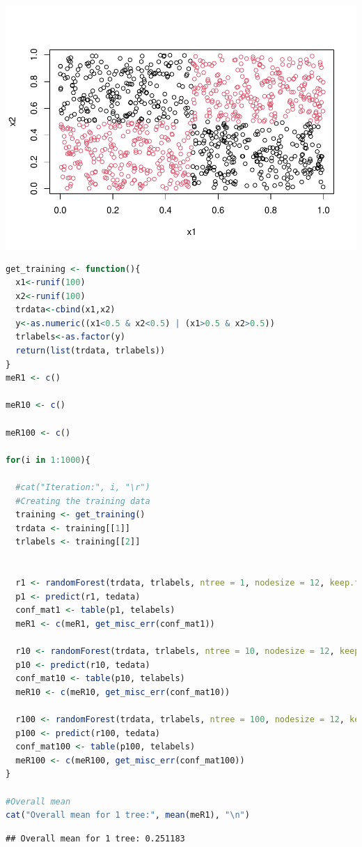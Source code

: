 \documentclass[
]{article}
\begin{document}
\includegraphics{Block2Lab1_files/figure-latex/1.4-1.pdf}

\begin{lstlisting}[language=R]
get_training <- function(){
  x1<-runif(100)
  x2<-runif(100)
  trdata<-cbind(x1,x2)
  y<-as.numeric((x1<0.5 & x2<0.5) | (x1>0.5 & x2>0.5))
  trlabels<-as.factor(y)
  return(list(trdata, trlabels))
}
meR1 <- c()

meR10 <- c()

meR100 <- c()

for(i in 1:1000){
  
  #cat("Iteration:", i, "\r")
  #Creating the training data
  training <- get_training()
  trdata <- training[[1]]
  trlabels <- training[[2]]
  
  
  r1 <- randomForest(trdata, trlabels, ntree = 1, nodesize = 12, keep.forest = TRUE)
  p1 <- predict(r1, tedata)
  conf_mat1 <- table(p1, telabels)
  meR1 <- c(meR1, get_misc_err(conf_mat1))
  
  r10 <- randomForest(trdata, trlabels, ntree = 10, nodesize = 12, keep.forest = TRUE)
  p10 <- predict(r10, tedata)
  conf_mat10 <- table(p10, telabels)
  meR10 <- c(meR10, get_misc_err(conf_mat10))
  
  r100 <- randomForest(trdata, trlabels, ntree = 100, nodesize = 12, keep.forest = TRUE)
  p100 <- predict(r100, tedata)
  conf_mat100 <- table(p100, telabels)
  meR100 <- c(meR100, get_misc_err(conf_mat100))
}

#Overall mean
cat("Overall mean for 1 tree:", mean(meR1), "\n")
\end{lstlisting}

\begin{lstlisting}
## Overall mean for 1 tree: 0.251183
\end{lstlisting}
\end{document}
